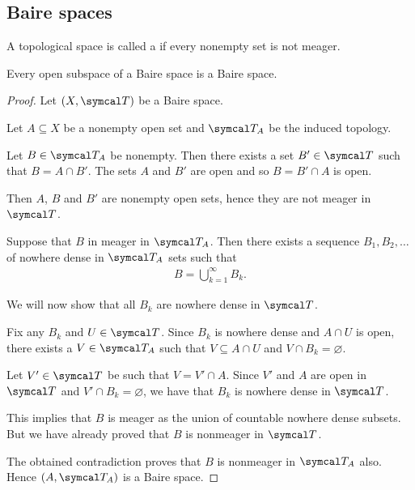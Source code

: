 \subsection{Baire spaces}\label{sec:baire_spaces}

\begin{definition}\label{def:baire_space}
  A topological space is called a  if every nonempty set is not meager.
\end{definition}

\begin{proposition}\label{thm:open_subspace_of_baire_space_is_baire}
  Every open subspace of a Baire space is a Baire space.
\end{proposition}
\begin{proof}
  Let \( (X, \Cal{T}) \) be a Baire space.

  Let \( A \subseteq X \) be a nonempty open set and \( \Cal{T}_A \) be the induced topology.

  Let \( B \in \Cal{T}_A \) be nonempty. Then there exists a set \( B' \in \Cal{T} \) such that \( B = A \cap B' \). The sets \( A \) and \( B' \) are open and so \( B = B' \cap A \) is open.

  Then \( A \), \( B \) and \( B' \) are nonempty open sets, hence they are not meager in \( \Cal{T} \).

  Suppose that \( B \) in meager in \( \Cal{T}_A \). Then there exists a sequence \( B_1, B_2, \ldots \) of nowhere dense in \( \Cal{T}_A \) sets such that
  \begin{align*}
    B = \bigcup_{k=1}^\infty B_k.
  \end{align*}

  We will now show that all \( B_k \) are nowhere dense in \( \Cal{T} \).

  Fix any \( B_k \) and \( U \in \Cal{T} \). Since \( B_k \) is nowhere dense and \( A \cap U \) is open, there exists a \( V \in \Cal{T}_A \) such that \( V \subseteq A \cap U \) and \( V \cap B_k = \varnothing \).

  Let \( V' \in \Cal{T} \) be such that \( V = V' \cap A \). Since \( V' \) and \( A \) are open in \( \Cal{T} \) and \( V' \cap B_k = \varnothing \), we have that \( B_k \) is nowhere dense in \( \Cal{T} \).

  This implies that \( B \) is meager as the union of countable nowhere dense subsets. But we have already proved that \( B \) is nonmeager in \( \Cal{T} \).

  The obtained contradiction proves that \( B \) is nonmeager in \( \Cal{T}_A \) also. Hence \( (A, \Cal{T}_A) \) is a Baire space.
\end{proof}
